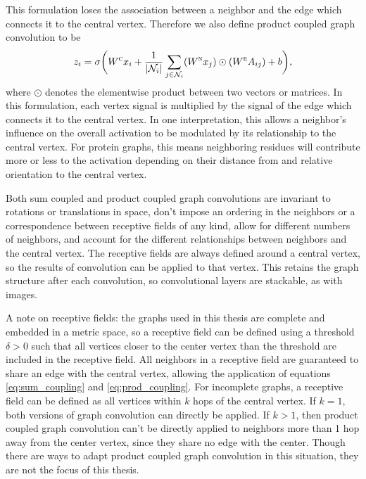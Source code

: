 This formulation loses the association between a neighbor and the edge which connects it to the central vertex. 
Therefore we also define product coupled graph convolution to be 
\begin{equation}
z_i = \sigma \bigg( W^{\textsc{c}} x_i + \frac{1}{|\mathcal{N}_i|}\sum_{j \in \mathcal{N}_i} (W^{\textsc{n}} x_j) \odot (W^{\textsc{e}} A_{ij}) + b \bigg),
\label{eq:prod_coupling}
\end{equation}
where $\odot$ denotes the elementwise product between two vectors or matrices. 
In this formulation, each vertex signal is multiplied by the signal of the edge which connects it to the central vertex.
In one interpretation, this allows a neighbor's influence on the overall activation to be modulated by its relationship to the central vertex.
For protein graphs, this means neighboring residues will contribute more or less to the activation depending on their distance from and relative orientation to the central vertex.

Both sum coupled and product coupled graph convolutions are invariant to rotations or translations in space, don't impose an ordering in the neighbors or a correspondence between receptive fields of any kind, allow for different numbers of neighbors, and account for the different relationships between neighbors and the central vertex. 
The receptive fields are always defined around a central vertex, so the results of convolution can be applied to that vertex.
This retains the graph structure after each convolution, so convolutional layers are stackable, as with images.

A note on receptive fields: 
the graphs used in this thesis are complete and embedded in a metric space, so a receptive field can be defined using a threshold $\delta>0$ such that all vertices closer to the center vertex than the threshold are included in the receptive field.
All neighbors in a receptive field are guaranteed to share an edge with the central vertex, allowing the application of equations \ref{eq:sum_coupling} and \ref{eq:prod_coupling}.
For incomplete graphs, a receptive field can be defined as all vertices within $k$ hops of the central vertex. 
If $k=1$, both versions of graph convolution can directly be applied.
If $k>1$, then product coupled graph convolution can't be directly applied to neighbors more than 1 hop away from the center vertex, since they share no edge with the center. 
Though there are ways to adapt product coupled graph convolution in this situation, they are not the focus of this thesis.

